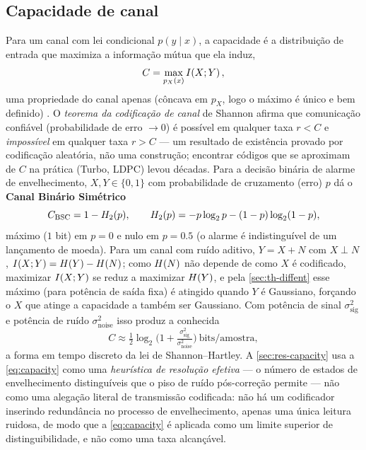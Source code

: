 \subsection{Capacidade de canal}
\label{sec:th-capacity}
Para um canal com lei condicional $p(y\mid x)$, a capacidade é a distribuição
de entrada que maximiza a informação mútua que ela induz,
\begin{equation}
  C = \max_{p_X(x)} I\!\left(X ; Y\right),
  \label{eq:capacity-def}
\end{equation}
uma propriedade do canal apenas (côncava em $p_X$, logo o máximo é único e
bem definido) \cite{cover2006}. O \emph{teorema da codificação de canal} de Shannon afirma que
comunicação confiável (probabilidade de erro $\to0$) é possível em qualquer
taxa $r<C$ e \emph{impossível} em qualquer taxa $r>C$ --- um resultado de
existência provado por codificação aleatória, não uma construção; encontrar
códigos que se aproximam de $C$ na prática (Turbo, LDPC) levou décadas. Para
a decisão binária de alarme de envelhecimento, $X,Y\in\{0,1\}$ com
probabilidade de cruzamento (erro) $p$ dá o \textbf{Canal Binário Simétrico}
\begin{equation}
  C_{\mathrm{BSC}} = 1 - H_2(p), \qquad H_2(p) = -p\log_2 p - (1-p)\log_2(1-p),
  \label{eq:bsc}
\end{equation}
máximo ($1$ bit) em $p=0$ e nulo em $p=0.5$ (o alarme é indistinguível de
um lançamento de moeda). Para um canal com ruído aditivo, $Y=X+N$ com
$X\perp N$, $I\!\left(X ; Y\right)=H\!\left(Y\right)-H\!\left(N\right)$; como $H\!\left(N\right)$ não depende de como
$X$ é codificado, maximizar $I\!\left(X ; Y\right)$ se reduz a maximizar $H\!\left(Y\right)$, e
pela \cref{sec:th-diffent} esse máximo (para potência de saída fixa) é
atingido quando $Y$ é Gaussiano, forçando o $X$ que atinge a capacidade a
também ser Gaussiano. Com potência de sinal $\sigma^2_{\text{sig}}$ e
potência de ruído $\sigma^2_{\text{noise}}$ isso produz a conhecida
\begin{equation}
  C \approx \tfrac{1}{2}\log_2\!\Big(1+\tfrac{\sigma^2_{\text{sig}}}{\sigma^2_{\text{noise}}}\Big)\ \text{bits/amostra},
  \label{eq:capacity}
\end{equation}
a forma em tempo discreto da lei de Shannon--Hartley. A
\cref{sec:res-capacity} usa a \cref{eq:capacity} como uma \emph{heurística de
resolução efetiva} --- o número de estados de envelhecimento
distinguíveis que o piso de ruído pós-correção permite --- não como uma
alegação literal de transmissão codificada: não há um codificador inserindo
redundância no processo de envelhecimento, apenas uma única leitura ruidosa,
de modo que a \cref{eq:capacity} é aplicada como um limite superior de
distinguibilidade, e não como uma taxa alcançável.

